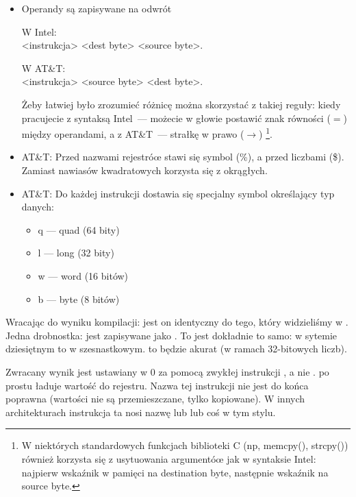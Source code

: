 \begin{itemize}

\item
Operandy są zapisywane na odwrót

W Intel: \\
<instrukcja> <dest byte> <source byte>.

W AT\&T: \\
<instrukcja> <source byte> <dest byte>.

Żeby łatwiej było zrozumieć różnicę można skorzystać z takiej reguły:
kiedy pracujecie z syntaksą Intel~--- możecie w głowie postawić znak równości ($=$) między operandami,
a z AT\&T~--- strałkę w prawo ($\rightarrow$)
\footnote{W niektórych standardowych funkcjach biblioteki C (np, memcpy(), strcpy()) również korzysta się z usytuowania argumentóœ jak w syntaksie Intel: najpierw wskaźnik w pamięci na destination byte, 
następnie wskaźnik na source byte.}.

\item
AT\&T: Przed nazwami rejestróœ stawi się symbol (\%), a przed liczbami (\$).
Zamiast nawiasów kwadratowych korzysta się z okrągłych.

\item
AT\&T: Do każdej instrukcji dostawia się specjalny symbol określający typ danych:

\begin{itemize}
\item q --- quad (64 bity)
\item l --- long (32 bity)
\item w --- word (16 bitów)
\item b --- byte (8 bitów)
\end{itemize}


\end{itemize}

Wracając do wyniku kompilacji: jest on identyczny do tego, który widzieliśmy w \IDA.
Jedna drobnostka:  jest zapisywane jako .
To jest dokładnie to samo:  w sytemie dziesiętnym to  w szesnastkowym.
 to będzie akurat  (w ramach 32-bitowych liczb).

Zwracany wynik jest ustawiany w 0 za pomocą zwykłej instrukcji \MOV, a nie \XOR.
\MOV po prostu ładuje wartość do rejestru.
Nazwa tej instrukcji nie jest do końca poprawna (wartości nie są przemieszczane, tylko kopiowane). W innych architekturach instrukcja ta nosi nazwę  lub  lub coś w tym stylu.


